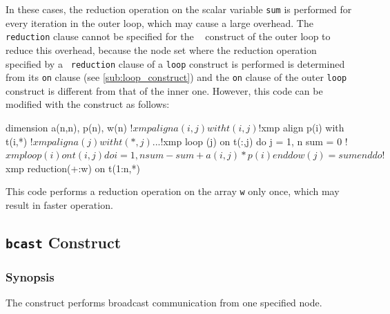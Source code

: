 \begin{description}

In these cases, the reduction operation on the scalar variable {\tt sum}
is performed for every iteration in the outer loop, which may cause a
large overhead.
The {\tt reduction} clause cannot be specified for the {\tt
{}} construct of the outer loop to reduce this overhead,
%
because the node set where the reduction operation specified by a {\tt
reduction} clause of a {\tt loop} construct is performed is determined
from its {\tt on} clause (see \ref{sub:loop_construct}) and
the {\tt on} clause of the outer {\tt loop} construct is different from
that of the inner one. 
%
However, this code can be modified with the {\tt {}}
construct as follows: 

\begin{Fexample}
      dimension a(n,n), p(n), w(n)
!$xmp align a(i,j) with t(i,j)
!$xmp align p(i) with t(i,*)
!$xmp align a(j) with t(*,j)
      ...
!$xmp loop (j) on t(:,j)
      do j = 1, n
          sum = 0
!$xmp loop (i) on t(i,j) 
          do i = 1, n
              sum - sum + a(i,j) * p(i)
          end do
          w(j) = sum
      end do
!$xmp reduction(+:w) on t(1:n,*)
\end{Fexample}

This code performs a reduction operation on the array {\tt w} only once,
which may result in faster operation.  

\end{description}


\subsection{{\tt bcast} Construct}

\subsubsection*{Synopsis}

The {\tt {}} construct performs broadcast communication
from one specified node.

